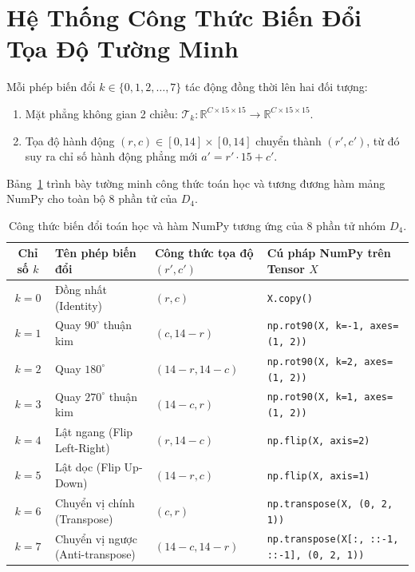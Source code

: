 \documentclass[11pt,a4paper]{report}
\begin{document}
\section{Hệ Thống Công Thức Biến Đổi Tọa Độ Tường Minh}

Mỗi phép biến đổi $k \in \{0, 1, 2, \dots, 7\}$ tác động đồng thời lên hai đối tượng:
\begin{enumerate}
    \item Mặt phẳng không gian 2 chiều: $\mathcal{T}_k: \mathbb{R}^{C \times 15 \times 15} \to \mathbb{R}^{C \times 15 \times 15}$.
    \item Tọa độ hành động $(r, c) \in [0, 14] \times [0, 14]$ chuyển thành $(r', c')$, từ đó suy ra chỉ số hành động phẳng mới $a' = r' \cdot 15 + c'$.
\end{enumerate}

Bảng~\ref{tab:d4_transformation_formulas} trình bày tường minh công thức toán học và tương đương hàm mảng NumPy cho toàn bộ 8 phần tử của $D_4$.

\begin{table}[htbp]
\centering
\caption{Công thức biến đổi toán học và hàm NumPy tương ứng của 8 phần tử nhóm $D_4$.}
\label{tab:d4_transformation_formulas}
\small
\begin{tabularx}{\textwidth}{c l l X}
\toprule
\textbf{Chỉ số $k$} & \textbf{Tên phép biến đổi} & \textbf{Công thức tọa độ $(r', c')$} & \textbf{Cú pháp NumPy trên Tensor $X$} \\
\midrule
$k = 0$ & Đồng nhất (Identity) & $(r, c)$ & \texttt{X.copy()} \\
$k = 1$ & Quay $90^\circ$ thuận kim & $(c, 14 - r)$ & \texttt{np.rot90(X, k=-1, axes=(1, 2))} \\
$k = 2$ & Quay $180^\circ$ & $(14 - r, 14 - c)$ & \texttt{np.rot90(X, k=2, axes=(1, 2))} \\
$k = 3$ & Quay $270^\circ$ thuận kim & $(14 - c, r)$ & \texttt{np.rot90(X, k=1, axes=(1, 2))} \\
$k = 4$ & Lật ngang (Flip Left-Right) & $(r, 14 - c)$ & \texttt{np.flip(X, axis=2)} \\
$k = 5$ & Lật dọc (Flip Up-Down) & $(14 - r, c)$ & \texttt{np.flip(X, axis=1)} \\
$k = 6$ & Chuyển vị chính (Transpose) & $(c, r)$ & \texttt{np.transpose(X, (0, 2, 1))} \\
$k = 7$ & Chuyển vị ngược (Anti-transpose) & $(14 - c, 14 - r)$ & \texttt{np.transpose(X[:, ::-1, ::-1], (0, 2, 1))} \\
\bottomrule
\end{tabularx}
\end{table}
\end{document}
